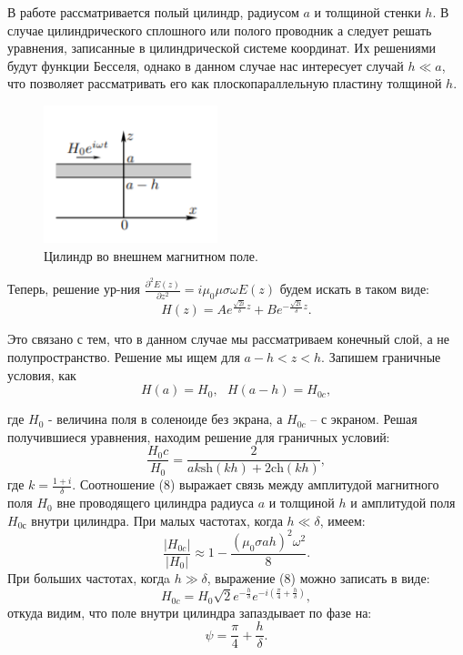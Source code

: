 \documentclass[a4paper, 14pt]{extarticle}%
\newcommand\ECaption[1]{%
     \captionsetup{font=footnotesize}%
     \caption{#1}}
\begin{document}
В работе рассматривается полый цилиндр, радиусом $a$ и толщиной стенки $h$. В случае цилиндрического сплошного или полого проводник
а следует решать уравнения, записанные в цилиндрической системе
координат. Их решениями будут функции Бесселя, однако в данном случае нас интересует случай $h\ll a$, что позволяет рассматривать его как плоскопараллельную пластину толщиной $h$. 

\begin{figure}
\begin{center}
\includegraphics[height=4cm]{teor2.png}
\end{center}
\ECaption{Цилиндр во внешнем магнитном поле.}
\end{figure}

Теперь, решение ур-ния $\frac{\partial^2E(z)}{\partial z^2} = i\mu_0\mu\sigma\omega E(z)$ будем искать в таком виде: 
\[H(z) = Ae^{\frac{\sqrt{2i}}{\delta}z}+ Be^{-\frac{\sqrt{2i}}{\delta}z}.\]

Это связано с тем, что в данном случае мы рассматриваем конечный слой, а не полупространство. Решение мы ищем для $a-h<z<h$. Запишем граничные условия, как 
\[H(a) = H_0, \text{ } H(a-h) = H_{0c},\]

где $H_0$ - величина поля в соленоиде без экрана, а $H_{0c}$ -- с экраном. Решая получившиеся уравнения, находим решение для граничных условий:
\begin{equation}
\dfrac{H_0c}{H_0} = \dfrac{2}{ak\text{sh}(kh) + 2\text{ch}(kh)},
\end{equation}
где $k = \frac{1+i}{\delta}$. Соотношение (8) выражает связь между амплитудой магнитного поля
$H_0$ вне проводящего цилиндра радиуса $a$ и толщиной $h$ и амплитудой поля $H_{0с}$ внутри цилиндра. При малых частотах, когда $h\ll\delta$, имеем:
\begin{equation}
\dfrac{|H_{0c}|}{|H_0|}\approx 1 - \dfrac{(\mu_0\sigma ah)^2\omega^2}{8}.
\end{equation}
При больших частотах, когдa $h\gg\delta$, выражение (8) можно записать в виде: 
\[H_{0c} = H_0\sqrt{2} e^{-\frac{h}{\delta}}e^{-i(\frac{\pi}{4}+\frac{h}{\delta})},\]
откуда видим, что поле внутри цилиндра запаздывает по фазе на:
\begin{equation}
\psi = \frac{\pi}{4}+\frac{h}{\delta}.
\end{equation}
\end{document}
